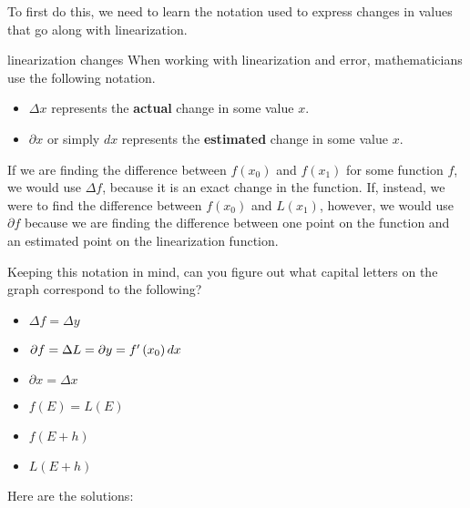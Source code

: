 To first do this, we need to learn the notation used to express changes in values that go along with linearization.

\begin{notation}{linearization changes}
    When working with linearization and error, mathematicians use the following notation.
    
    \begin{itemize}
        \item \( \Delta x \) represents the \textbf{actual} change in some value \( x \).
        \item \( \partial x \) or simply \( dx \) represents the \textbf{estimated} change in some value \( x \).
    \end{itemize}
    
    If we are finding the difference between \( f \left( x_0 \right) \) and \( f \left( x_1 \right) \) for some function \( f \), we would use \( \Delta f \), because it is an exact change in the function. If, instead, we were to find the difference between \( f \left( x_0 \right) \) and \( L \left( x_1 \right) \), however, we would use \( \partial f \) because we are finding the difference between one point on the function and an estimated point on the linearization function.
\end{notation}

Keeping this notation in mind, can you figure out what capital letters on the graph correspond to the following?

\begin{multicols}{2}
    \begin{itemize}
        \item \( \Delta f = \Delta y \)
        \item \( \partial f = \Delta L = \partial y = f^\prime \left( x_0 \right) dx \)
        \item \( \partial x = \Delta x \)
        \item \( f \left( E \right) = L \left( E \right) \)
        \item \( f \left( E + h \right) \)
        \item \( L \left( E + h \right) \)
    \end{itemize}
\end{multicols}

Here are the solutions:

